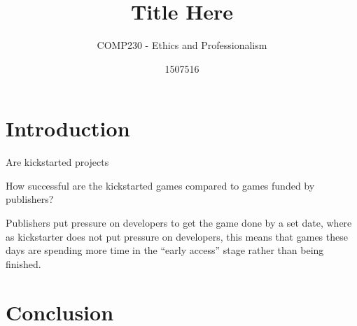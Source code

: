 \documentclass{scrartcl}
\title{Title Here}
\subtitle{COMP230 - Ethics and Professionalism}
\author{1507516}
\begin{document}
\maketitle


\section{Introduction}

Are kickstarted projects 

How successful are the kickstarted games compared to games funded by publishers?

Publishers put pressure on developers to get the game done by a set date, where as kickstarter does not put pressure on developers, this means that games these days are spending more time in the ``early access'' stage rather than being finished.



\section{}


\section{Conclusion}




\end{document}
